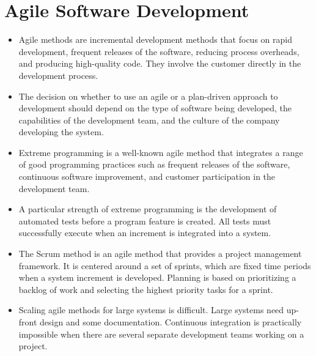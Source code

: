 \documentclass{article}
\begin{document}
\section{Agile Software Development}
\begin{itemize}
    \item Agile  methods are incremental development methods that focus on rapid development, frequent releases of the software, reducing process overheads, and producing high-quality code.  They involve the customer directly in the development process.
    \item The decision on whether to use an agile or a plan-driven approach to development should depend on the type of software being developed, the capabilities of the development team, and the culture of the company developing the system.
    \item Extreme programming is a well-known agile method that integrates a range of good programming practices such as frequent releases of the software, continuous software improvement, and customer participation in the development team.
    \item A particular strength of extreme programming is the development of automated tests before a program feature is created.  All tests must successfully execute when an increment is integrated into a system.
    \item The Scrum method is an agile method that provides a project management framework.  It is centered around a set of sprints, which are fixed time periods when a system increment is developed. Planning is based on prioritizing a backlog of work and selecting the highest priority tasks for a sprint.
    \item Scaling agile methods for large systems is difficult.  Large systems need up-front design and some documentation.  Continuous integration is practically impossible when there are several separate development teams working on a project.
\end{itemize}
\end{document}
